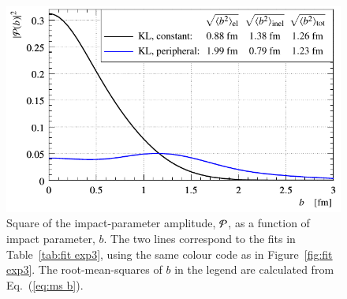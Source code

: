 \begin{figure}
\begin{center}
\includegraphics{fig/fit_exp3/b_dist.pdf}
\caption{%
Square of the impact-parameter amplitude, ${\cal P}$, as a function of impact parameter, $b$. The two lines correspond to the fits in Table~\ref{tab:fit exp3}, using the same colour code as in Figure~\ref{fig:fit exp3}. The root-mean-squares of $b$ in the legend are calculated from Eq.~(\ref{eq:ms b}).
}%
\label{fig:bdist exp3}
\end{center}
\end{figure}


